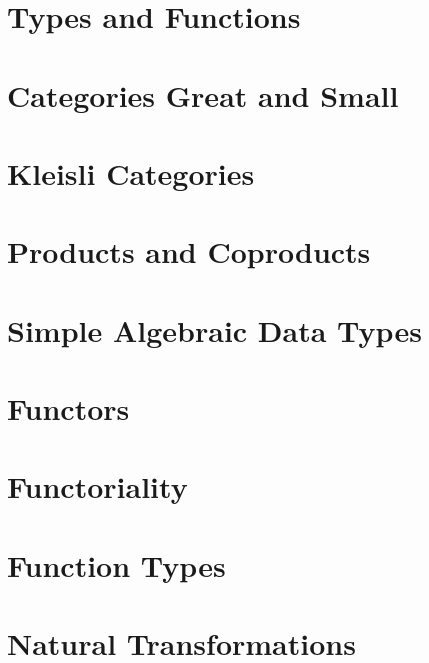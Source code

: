 \chapter{Types and Functions}\label{types-and-functions}


\chapter{Categories Great and Small}\label{categories-great-and-small}


\chapter{Kleisli Categories}\label{kleisli-categories-page}


\chapter{Products and Coproducts}\label{products-and-coproducts}


\chapter{Simple Algebraic Data Types}\label{simple-algebraic-data-types}


\chapter{Functors}\label{functors}


\chapter{Functoriality}\label{functoriality}


\chapter{Function Types}\label{function-types}


\chapter{Natural Transformations}\label{natural-transformations}


